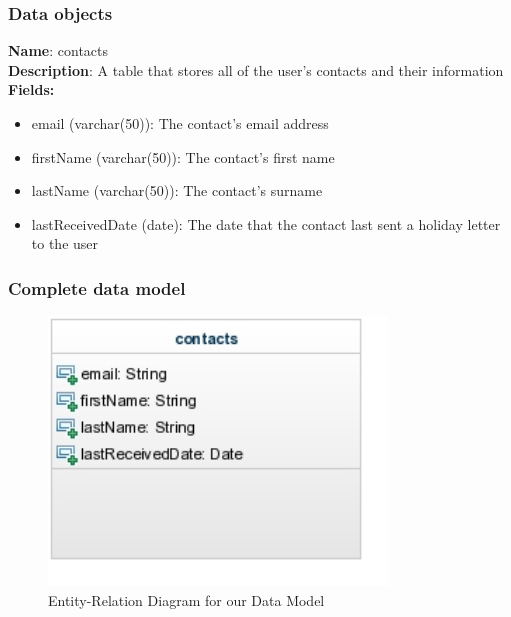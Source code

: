 \documentclass{article}
\begin{document}
\subsubsection{Data objects}
\textbf{Name}: contacts \\
\textbf{Description}: A table that stores all of the user's contacts and their information \\
\textbf{Fields:}
\begin{itemize}
\item email (varchar(50)): The contact's email address
\item firstName (varchar(50)): The contact's first name
\item lastName (varchar(50)): The contact's surname
\item lastReceivedDate (date): The date that the contact last sent a holiday letter to the user
\end{itemize}


\subsubsection{Complete data model}
\begin{figure}[H]
\centering
\includegraphics[width=90mm]{img/db_erd.jpg}
\caption{Entity-Relation Diagram for our Data Model \label{db_erd}}
\end{figure}

\end{document}
